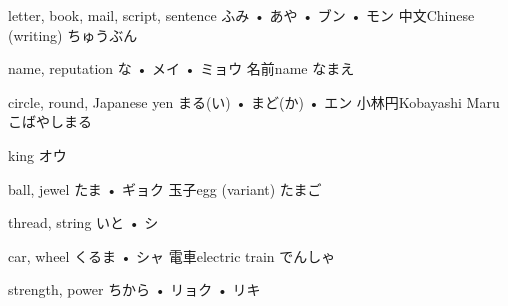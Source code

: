 



\setcounter{cardnum}{73}

		{letter, book, mail, script, sentence}
		{ふみ • あや • ブン • モン}
		{中文}{Chinese (writing) ちゅうぶん}
		{}{}
		{}{}
		{}{}
		{}{}

		{name, reputation}
		{な • メイ • ミョウ}
		{名前}{name なまえ}
		{}{}
		{}{}
		{}{}
		{}{}

		{circle, round, Japanese yen}
		{まる(い) • まど(か) • エン}
		{小林円}{Kobayashi Maru こばやしまる}
		{}{}
		{}{}
		{}{}
		{}{}

		{king}
		{オウ}
		{}{}
		{}{}
		{}{}
		{}{}
		{}{}

		{ball, jewel}
		{たま • ギョク}
		{玉子}{egg (variant) たまご}
		{}{}
		{}{}
		{}{}
		{}{}

		{thread, string}
		{いと • シ}
		{}{}
		{}{}
		{}{}
		{}{}
		{}{}

		{car, wheel}
		{くるま • シャ}
		{電車}{electric train でんしゃ}
		{}{}
		{}{}
		{}{}
		{}{}

		{strength, power}
		{ちから • リョク • リキ}
		{}{}
		{}{}
		{}{}
		{}{}
		{}{}

